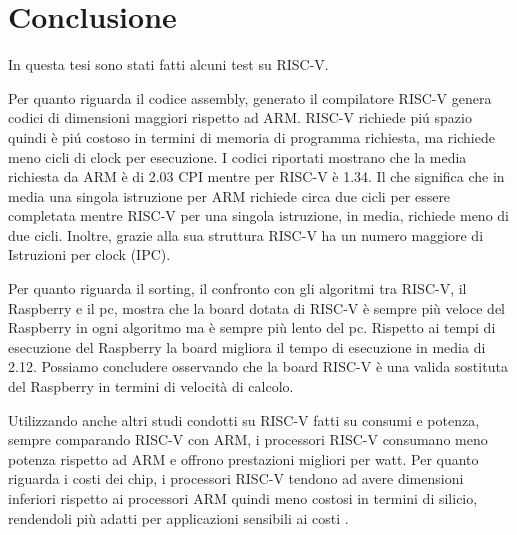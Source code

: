 \documentclass[12pt, a4paper]{report}
\begin{document}

\chapter{Conclusione}

In questa tesi sono stati fatti alcuni test su RISC-V. 


Per quanto riguarda il codice assembly, generato il compilatore RISC-V genera codici di dimensioni maggiori rispetto ad ARM. RISC-V richiede pi\'u spazio quindi è pi\'u costoso in termini di memoria di programma richiesta, ma richiede meno cicli di clock per esecuzione. I codici riportati mostrano che la media richiesta da ARM è di 2.03 CPI mentre per RISC-V è 1.34. Il che significa che in media una singola istruzione per ARM richiede circa due cicli per essere completata mentre RISC-V per una singola istruzione, in media, richiede meno di due cicli. Inoltre, grazie alla sua struttura RISC-V ha un numero maggiore di Istruzioni per clock (IPC). 

Per quanto riguarda il sorting, il confronto con gli algoritmi tra RISC-V, il Raspberry e il pc, mostra che la board dotata di RISC-V è sempre più veloce del Raspberry in ogni algoritmo ma è sempre più lento del pc. Rispetto ai tempi di esecuzione del Raspberry la board
migliora il tempo di esecuzione in media di 2.12. 
Possiamo concludere osservando che la board RISC-V è una valida sostituta del Raspberry in termini di velocità di calcolo.%

Utilizzando anche altri studi condotti su RISC-V fatti su consumi e potenza,
sempre comparando RISC-V con ARM, i processori RISC-V consumano meno potenza rispetto ad ARM e offrono prestazioni migliori per watt.  Per quanto riguarda i costi dei chip, i processori RISC-V tendono ad avere dimensioni inferiori rispetto ai processori ARM quindi meno costosi in termini di silicio, rendendoli più adatti per applicazioni sensibili ai costi \cite{blogArmRISC-V}.
\end{document}
